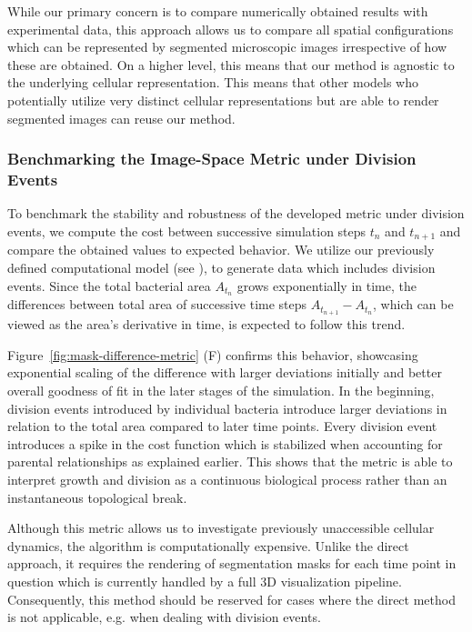 While our primary concern is to compare numerically obtained results with experimental data,
this approach allows us to compare all spatial configurations which can be represented
by segmented microscopic images irrespective of how these are obtained.
On a higher level, this means that our method is agnostic to the underlying cellular
representation.
This means that other models who potentially utilize very distinct cellular
representations but are
able to render segmented images can reuse our method.

\subsubsection{Benchmarking the Image-Space Metric under Division Events}
To benchmark the stability and robustness of the developed metric under division
events, we compute
the cost between successive simulation steps $t_n$ and $t_{n+1}$ and compare the
obtained values to
expected behavior.
We utilize our previously defined computational model (see
), to
generate data which includes division events.
Since the total bacterial area $A_{t_n}$ grows exponentially in time, the differences
between total
area of successive time steps $A_{t_{n+1}}-A_{t_n}$, which can be viewed as the
area's derivative in
time, is expected to follow this trend.

Figure~\ref{fig:mask-difference-metric} (F) confirms this behavior, showcasing
exponential scaling
of the difference with larger deviations initially and better overall goodness of fit
in the later
stages of the simulation.
In the beginning, division events introduced by individual bacteria introduce larger
deviations in
relation to the total area compared to later time points.
Every division event introduces a spike in the cost function which is stabilized when accounting
for parental relationships as explained earlier.
This shows that the metric is able to interpret growth and division as a continuous biological
process rather than an instantaneous topological break.

Although this metric allows us to investigate previously unaccessible cellular dynamics, the
algorithm is computationally expensive.
Unlike the direct approach, it requires the rendering of segmentation masks for each
time point in
question which is currently handled by a full 3D visualization pipeline.
Consequently, this method should be reserved for cases where the direct method is not
applicable,
e.g. when dealing with division events.

